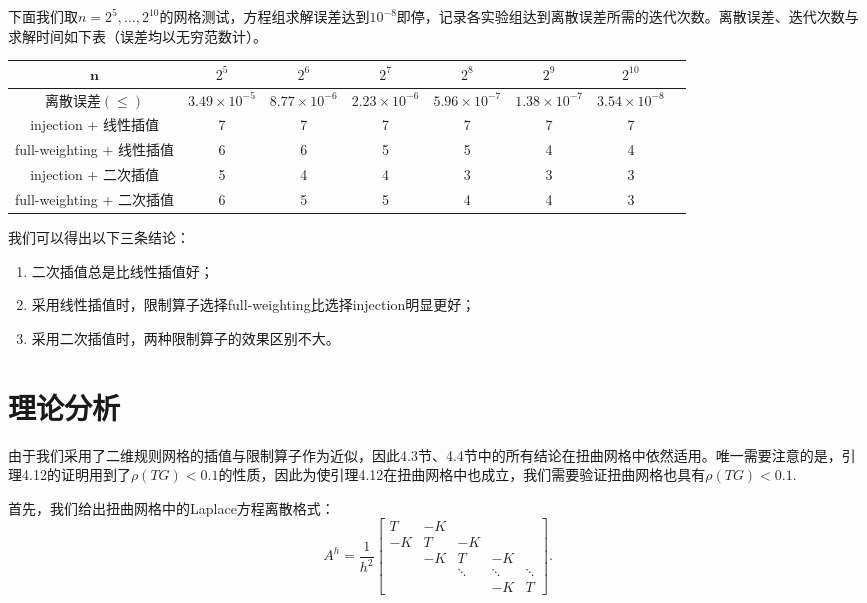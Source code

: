 \documentclass[lang=cn,10pt]{elegantbook}
\begin{document}
下面我们取$n=2^{5},...,2^{10}$的网格测试，方程组求解误差达到$10^{-8}$即停，记录各实验组达到离散误差所需的迭代次数。离散误差、迭代次数与求解时间如下表（误差均以无穷范数计）。

\begin{table}[H]
  \centering
  \small
  \begin{tabular}{c|ccccccc}
   $\mathbf{n}$      & $2^{5}$                   & $2^{6}$                   & $2^{7}$                  & $2^{8}$      & $2^{9}$   & $2^{10}$           \\ \hline
离散误差$(\leq)$   & $3.49\times 10^{-5}$ & $8.77\times 10^{-6}$ & $2.23\times 10^{-6}$ & $5.96\times 10^{-7}$ & $1.38\times 10^{-7}$ & $3.54\times 10^{-8}$ \\
injection + 线性插值        & 7  & 7 & 7 & 7 & 7 & 7 \\
full-weighting + 线性插值   & 6  & 6 & 5 & 5 & 4 & 4 \\
injection + 二次插值        & 5  & 4 & 4 & 3 & 3 & 3 \\
full-weighting + 二次插值   & 6  & 5 & 5 & 4 & 4 & 3 \\
\end{tabular}
\end{table}

我们可以得出以下三条结论：
\begin{enumerate}
  \item 二次插值总是比线性插值好；
  \item 采用线性插值时，限制算子选择full-weighting比选择injection明显更好；
  \item 采用二次插值时，两种限制算子的效果区别不大。
\end{enumerate}

\section{理论分析}

由于我们采用了二维规则网格的插值与限制算子作为近似，因此4.3节、4.4节中的所有结论在扭曲网格中依然适用。唯一需要注意的是，引理4.12的证明用到了$\rho(TG)<0.1$的性质，因此为使引理4.12在扭曲网格中也成立，我们需要验证扭曲网格也具有$\rho(TG)<0.1$.

首先，我们给出扭曲网格中的Laplace方程离散格式：
\begin{equation}
  A^h=\frac{1}{h^2}\begin{bmatrix}
    T & -K & \\
    -K & T & -K & \\
    & -K & T & -K &\\
    & & \ddots & \ddots & \ddots\\
    & & & -K & T
  \end{bmatrix}.
\end{equation}
\end{document}

